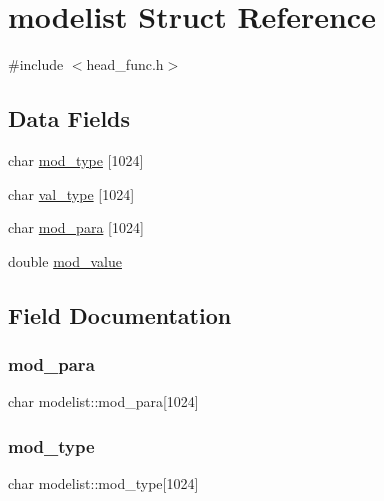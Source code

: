 \hypertarget{structmodelist}{}\section{modelist Struct Reference}
\label{structmodelist}


{\ttfamily \#include $<$head\+\_\+func.\+h$>$}

\subsection*{Data Fields}
\begin{DoxyCompactItemize}
\item 
char \mbox{\hyperlink{structmodelist_a068e7f710ae1dbbed8ef8c68e71a2b91}{mod\+\_\+type}} \mbox{[}1024\mbox{]}
\item 
char \mbox{\hyperlink{structmodelist_a021d603ad90c192eb29a62dc8937f4c6}{val\+\_\+type}} \mbox{[}1024\mbox{]}
\item 
char \mbox{\hyperlink{structmodelist_ac520e8be9fcb357f957ea9039f0f9be2}{mod\+\_\+para}} \mbox{[}1024\mbox{]}
\item 
double \mbox{\hyperlink{structmodelist_a8202a807f9745943756610b00ab82a3a}{mod\+\_\+value}}
\end{DoxyCompactItemize}


\subsection{Field Documentation}
\mbox{\label{structmodelist_ac520e8be9fcb357f957ea9039f0f9be2}} 
\subsubsection{\texorpdfstring{mod\_para}{mod\_para}}
{\footnotesize\ttfamily char modelist\+::mod\+\_\+para\mbox{[}1024\mbox{]}}

\mbox{\label{structmodelist_a068e7f710ae1dbbed8ef8c68e71a2b91}} 
\subsubsection{\texorpdfstring{mod\_type}{mod\_type}}
{\footnotesize\ttfamily char modelist\+::mod\+\_\+type\mbox{[}1024\mbox{]}}

